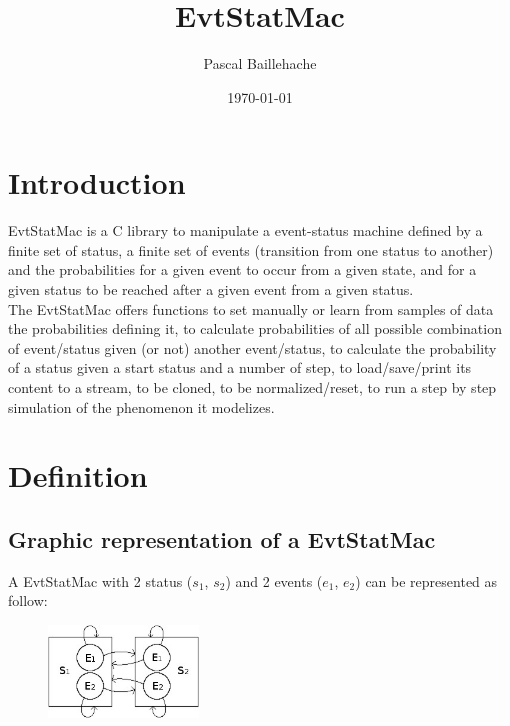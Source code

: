 \documentclass[12pt, a4paper]{article}
\begin{document}
\title{EvtStatMac}
\date{\today}
\author{Pascal Baillehache}
\maketitle

\tableofcontents

\section{Introduction}

EvtStatMac is a C library to manipulate a event-status machine defined by a finite set of status, a finite set of events (transition from one status to another) and the probabilities for a given event to occur from a given state, and for a given status to be reached after a given event from a given status.\\

The EvtStatMac offers functions to set manually or learn from samples of data the probabilities defining it, to calculate probabilities of all possible combination of event/status given (or not) another event/status, to calculate the probability of a status given a start status and a number of step, to load/save/print its content to a stream, to be cloned, to be normalized/reset, to run a step by step simulation of the phenomenon it modelizes.\\

\section{Definition}

\subsection{Graphic representation of a EvtStatMac}

A EvtStatMac with 2 status ($s_1$, $s_2$) and 2 events ($e_1$, $e_2$) can be represented as follow:\\

\begin{center}
\begin{figure}[H]
\centering
\includegraphics[width=4cm]{./evtstatmac.jpg}
\end{figure}
\end{center}
\end{document}
